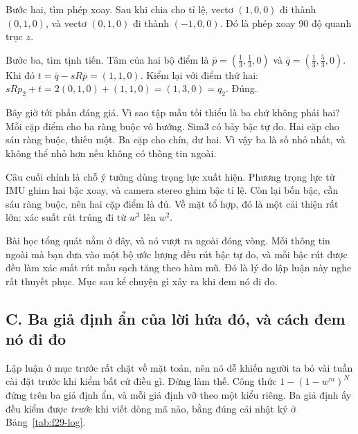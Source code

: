 \documentclass[../../deep_learning.tex]{subfiles}
\begin{document}
Bước hai, tìm phép xoay. Sau khi chia cho tỉ lệ, vectơ \((1,0,0)\) đi thành \((0,1,0)\), và vectơ \((0,1,0)\) đi thành \((-1,0,0)\). Đó là phép xoay 90 độ quanh trục \(z\).

Bước ba, tìm tịnh tiến. Tâm của hai bộ điểm là \(\bar p=(\tfrac13,\tfrac13,0)\) và \(\bar q=(\tfrac13,\tfrac53,0)\). Khi đó \(t=\bar q - sR\bar p = (1,1,0)\). Kiểm lại với điểm thứ hai: \(sRp_2+t = 2(0,1,0)+(1,1,0)=(1,3,0)=q_2\). Đúng.

Bây giờ tới phần đáng giá. Vì sao tập mẫu tối thiểu là ba chứ không phải hai? Mỗi cặp điểm cho ba ràng buộc vô hướng. Sim3 có bảy bậc tự do. Hai cặp cho sáu ràng buộc, thiếu một. Ba cặp cho chín, dư hai. Vì vậy ba là số nhỏ nhất, và không thể nhỏ hơn nếu không có thông tin ngoài.

Câu cuối chính là chỗ ý tưởng dùng trọng lực xuất hiện. Phương trọng lực từ IMU ghim hai bậc xoay, và camera stereo ghim bậc tỉ lệ. Còn lại bốn bậc, cần sáu ràng buộc, nên hai cặp điểm là đủ. Về mặt tổ hợp, đó là một cải thiện rất lớn: xác suất rút trúng đi từ \(w^3\) lên \(w^2\).

Bài học tổng quát nằm ở đây, và nó vượt ra ngoài đóng vòng. Mỗi thông tin ngoài mà bạn đưa vào một bộ ước lượng đều rút bậc tự do, và mỗi bậc rút được đều làm xác suất rút mẫu sạch tăng theo hàm mũ. Đó là lý do lập luận này nghe rất thuyết phục. Mục sau kể chuyện gì xảy ra khi đem nó đi đo.

\subsection{C. Ba giả định ẩn của lời hứa đó, và cách đem nó đi đo}
Lập luận ở mục trước rất chặt về mặt toán, nên nó dễ khiến người ta bỏ vài tuần cài đặt trước khi kiểm bất cứ điều gì. Đừng làm thế. Công thức \(1-(1-w^m)^N\) đứng trên ba giả định ẩn, và mỗi giả định vỡ theo một kiểu riêng. Ba giả định ấy đều kiểm được \emph{trước} khi viết dòng mã nào, bằng đúng cái nhật ký ở Bảng~\ref{tab:f29-log}.
\end{document}
